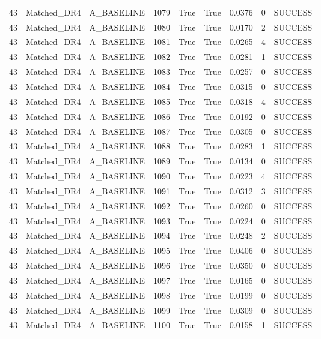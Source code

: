 \documentclass[11pt,a4paper,oneside]{book}
\begin{document}
\begin{longtable}{l l l l l l l l l}
43 & Matched\_DR4 & A\_BASELINE & 1079 & True & True & 0.0376 & 0 & SUCCESS \\
43 & Matched\_DR4 & A\_BASELINE & 1080 & True & True & 0.0170 & 2 & SUCCESS \\
43 & Matched\_DR4 & A\_BASELINE & 1081 & True & True & 0.0265 & 4 & SUCCESS \\
43 & Matched\_DR4 & A\_BASELINE & 1082 & True & True & 0.0281 & 1 & SUCCESS \\
43 & Matched\_DR4 & A\_BASELINE & 1083 & True & True & 0.0257 & 0 & SUCCESS \\
43 & Matched\_DR4 & A\_BASELINE & 1084 & True & True & 0.0315 & 0 & SUCCESS \\
43 & Matched\_DR4 & A\_BASELINE & 1085 & True & True & 0.0318 & 4 & SUCCESS \\
43 & Matched\_DR4 & A\_BASELINE & 1086 & True & True & 0.0192 & 0 & SUCCESS \\
43 & Matched\_DR4 & A\_BASELINE & 1087 & True & True & 0.0305 & 0 & SUCCESS \\
43 & Matched\_DR4 & A\_BASELINE & 1088 & True & True & 0.0283 & 1 & SUCCESS \\
43 & Matched\_DR4 & A\_BASELINE & 1089 & True & True & 0.0134 & 0 & SUCCESS \\
43 & Matched\_DR4 & A\_BASELINE & 1090 & True & True & 0.0223 & 4 & SUCCESS \\
43 & Matched\_DR4 & A\_BASELINE & 1091 & True & True & 0.0312 & 3 & SUCCESS \\
43 & Matched\_DR4 & A\_BASELINE & 1092 & True & True & 0.0260 & 0 & SUCCESS \\
43 & Matched\_DR4 & A\_BASELINE & 1093 & True & True & 0.0224 & 0 & SUCCESS \\
43 & Matched\_DR4 & A\_BASELINE & 1094 & True & True & 0.0248 & 2 & SUCCESS \\
43 & Matched\_DR4 & A\_BASELINE & 1095 & True & True & 0.0406 & 0 & SUCCESS \\
43 & Matched\_DR4 & A\_BASELINE & 1096 & True & True & 0.0350 & 0 & SUCCESS \\
43 & Matched\_DR4 & A\_BASELINE & 1097 & True & True & 0.0165 & 0 & SUCCESS \\
43 & Matched\_DR4 & A\_BASELINE & 1098 & True & True & 0.0199 & 0 & SUCCESS \\
43 & Matched\_DR4 & A\_BASELINE & 1099 & True & True & 0.0309 & 0 & SUCCESS \\
43 & Matched\_DR4 & A\_BASELINE & 1100 & True & True & 0.0158 & 1 & SUCCESS \\

\end{longtable}
\end{document}
